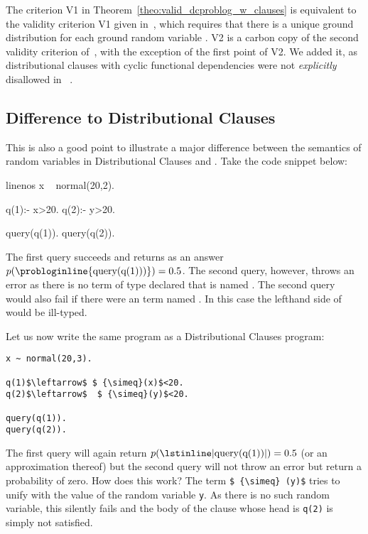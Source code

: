 The criterion V1 in Theorem~\ref{theo:valid_dcproblog_w_clauses} is equivalent to the validity criterion V1 given in~\citep[Definition 3]{gutmann2011magic}, which requires that there is a unique ground distribution for each ground random variable . V2 is a carbon copy of the second validity criterion of~\citep[Definition 3]{gutmann2011magic}, with the exception of the first point of V2. We added it, as distributional clauses with cyclic functional dependencies were not {\em explicitly} disallowed in ~\citep{gutmann2011magic}.

\subsection*{Difference to Distributional Clauses}


This is also a good point to illustrate a major difference between the semantics of random variables in Distributional Clauses and \dcproblogsty. Take the code snippet below:
\begin{problog*}{linenos}
x ~ normal(20,2).

q(1):- x>20.
q(2):- y>20.

query(q(1)).
query(q(2)).
\end{problog*}
The first query succeeds and returns as an answer $p(\text{\probloginline{query(q(1)))}}) = 0.5$. The second query, however, throws an error as there is no term of type  declared that is named . The second query would also fail if there were an  term named . In this case the lefthand side of  would be ill-typed.

Let us now write the same program as a Distributional Clauses program:
\begin{adjustwidth}{1em}{0em}
	{
		\normalfont
		\begin{lstlisting}[breaklines,mathescape]
x ~ normal(20,3).

q(1)$\leftarrow$ $ {\simeq}(x)$<20.
q(2)$\leftarrow$  $ {\simeq}(y)$<20.

query(q(1)).
query(q(2)).
		\end{lstlisting}
	}
\end{adjustwidth}
The first query will again return $ p(\text{\lstinline|query(q(1))|}) =0.5$ (or an approximation thereof) but the second query will not throw an error but return a probability of zero. How does this work? The term \lstinline[mathescape]|$ {\simeq} (y)$| tries to unify with the value of the random variable \lstinline|y|. As there is no such random variable, this silently fails and the body of the clause whose head is \lstinline|q(2)| is simply not satisfied.


